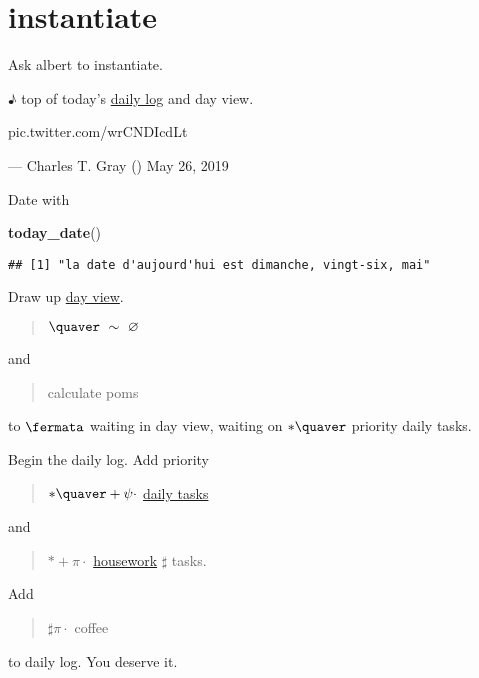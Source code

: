 \documentclass[]{book}
\newenvironment{Shaded}{\begin{snugshade}}{\end{snugshade}}
\newcommand{\KeywordTok}[1]{\textcolor[rgb]{0.13,0.29,0.53}{\textbf{#1}}}
\newcommand{\NormalTok}[1]{#1}
\begin{document}
\hypertarget{instantiate}{%
\section{instantiate}\label{instantiate}}

Ask albert to instantiate.

♪ top of today's \protect\hyperlink{daily-log}{daily log} and day view.

pic.twitter.com/wrCNDIcdLt

--- Charles T. Gray (\citet{cantabile}) May 26, 2019

Date with

\begin{Shaded}
\begin{Highlighting}[]
\KeywordTok{today_date}\NormalTok{()}
\end{Highlighting}
\end{Shaded}

\begin{verbatim}
## [1] "la date d'aujourd'hui est dimanche, vingt-six, mai"
\end{verbatim}

Draw up \protect\hyperlink{day-view}{day view}.

\begin{quote}
\(\quaver \ \sim \ \varnothing\)
\end{quote}

and

\begin{quote}
calculate poms
\end{quote}

to \(\fermata\) waiting in day view, waiting on \(*\quaver\) priority daily tasks.

Begin the daily log. Add priority

\begin{quote}
\(*\quaver+\psi\cdot\) \protect\hyperlink{daily-tasks}{daily tasks}
\end{quote}

and

\begin{quote}
\(*+\pi\cdot\) \protect\hyperlink{housework}{housework} \(\sharp\) tasks.
\end{quote}

Add

\begin{quote}
\(\sharp \pi \cdot\) coffee
\end{quote}

to daily log. You deserve it.
\end{document}
